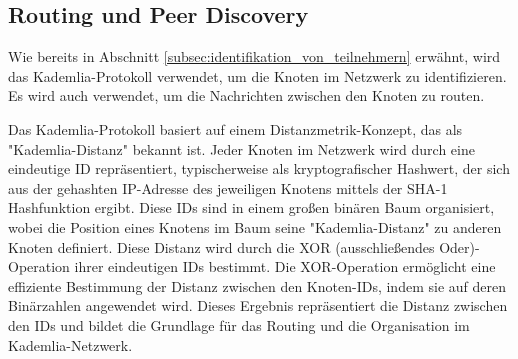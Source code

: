 \subsection{Routing und Peer Discovery}
\label{subsec:routing}

Wie bereits in Abschnitt \ref{subsec:identifikation_von_teilnehmern} 
 erwähnt,
wird das Kademlia-Protokoll verwendet, um die Knoten im Netzwerk zu identifizieren.
Es wird auch verwendet, um die Nachrichten zwischen den Knoten zu routen.




Das Kademlia-Protokoll basiert auf einem Distanzmetrik-Konzept, das als \\
"Kademlia-Distanz" bekannt ist. Jeder Knoten im Netzwerk wird durch eine eindeutige ID repräsentiert, 
typischerweise als kryptografischer Hashwert, der sich aus der gehashten IP-Adresse 
des jeweiligen Knotens mittels der SHA-1 Hashfunktion ergibt. Diese IDs sind in einem 
großen binären Baum organisiert, wobei die Position eines Knotens im Baum seine 
"Kademlia-Distanz" zu anderen Knoten definiert. Diese Distanz wird durch die XOR 
(ausschließendes Oder)-Operation ihrer eindeutigen IDs bestimmt. Die XOR-Operation 
ermöglicht eine effiziente Bestimmung der Distanz zwischen den Knoten-IDs, indem 
sie auf deren Binärzahlen angewendet wird. Dieses Ergebnis repräsentiert die 
Distanz zwischen den IDs und bildet die Grundlage für das Routing und die 
Organisation im Kademlia-Netzwerk.


